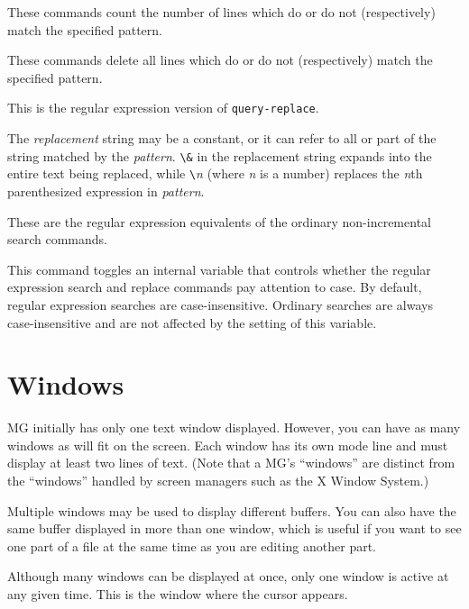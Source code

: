 \fbody These commands count the number of lines which do or do not
(respectively) match the specified pattern.

\fbody These commands delete all lines which do or do not (respectively)
match the specified pattern.


\fbody This is the regular expression version of {\tt query-replace}.

The {\em replacement\/} string may be a constant, or it can refer to
all or part of the string matched by the {\em pattern\/}.  \verb"\&" in
the replacement string expands into the entire text being replaced,
while \verb"\"{\em n\/} (where {\em n\/} is a number) replaces the 
{\em n\/}th parenthesized expression in {\em pattern\/}.

\fbody These are the regular expression equivalents of the ordinary
non-incremental search commands.

\fbody This command toggles an internal variable that controls whether
the regular expression search and replace commands pay attention to
case.  By default, regular expression searches are case-insensitive.
Ordinary searches are always case-insensitive and are not affected by
the setting of this variable.


\chapter{Windows}

MG initially has only one text window displayed.  However, you can have
as many windows as will fit on the screen.  Each window has its own mode
line and must display at least two lines of text.  (Note that a MG's
``windows'' are distinct from the ``windows'' handled by screen managers
such as the X Window System.)

Multiple windows may be used to display different buffers.  You can also
have the same buffer displayed in more than one window, which is useful
if you want to see one part of a file at the same time as you are editing
another part.

Although many windows can be displayed at once, only one window is active 
at any given time.  This is the window where the cursor appears.

